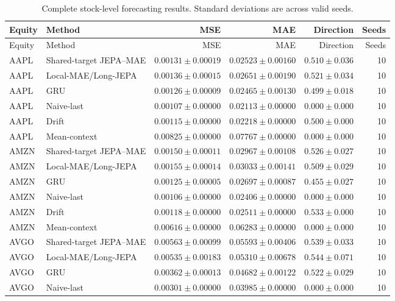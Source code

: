 \begin{longtable}{llrrrr}
\caption{Complete stock-level forecasting results. Standard deviations are across valid seeds.}\label{tab:appendix_stock_metrics}\\
\toprule
Equity & Method & MSE & MAE & Direction & Seeds \\
\midrule
\endfirsthead
\toprule
Equity & Method & MSE & MAE & Direction & Seeds \\
\midrule
\endhead
AAPL & Shared-target JEPA--MAE & $0.00131 \pm 0.00019$ & $0.02523 \pm 0.00160$ & $0.510 \pm 0.036$ & 10 \\
AAPL & Local-MAE/Long-JEPA & $0.00136 \pm 0.00015$ & $0.02651 \pm 0.00190$ & $0.521 \pm 0.034$ & 10 \\
AAPL & GRU & $0.00126 \pm 0.00009$ & $0.02465 \pm 0.00130$ & $0.499 \pm 0.018$ & 10 \\
AAPL & Naive-last & $0.00107 \pm 0.00000$ & $0.02113 \pm 0.00000$ & $0.000 \pm 0.000$ & 10 \\
AAPL & Drift & $0.00115 \pm 0.00000$ & $0.02218 \pm 0.00000$ & $0.500 \pm 0.000$ & 10 \\
AAPL & Mean-context & $0.00825 \pm 0.00000$ & $0.07767 \pm 0.00000$ & $0.000 \pm 0.000$ & 10 \\
AMZN & Shared-target JEPA--MAE & $0.00150 \pm 0.00011$ & $0.02967 \pm 0.00108$ & $0.526 \pm 0.027$ & 10 \\
AMZN & Local-MAE/Long-JEPA & $0.00155 \pm 0.00014$ & $0.03033 \pm 0.00141$ & $0.509 \pm 0.029$ & 10 \\
AMZN & GRU & $0.00125 \pm 0.00005$ & $0.02697 \pm 0.00087$ & $0.455 \pm 0.027$ & 10 \\
AMZN & Naive-last & $0.00106 \pm 0.00000$ & $0.02406 \pm 0.00000$ & $0.000 \pm 0.000$ & 10 \\
AMZN & Drift & $0.00118 \pm 0.00000$ & $0.02511 \pm 0.00000$ & $0.533 \pm 0.000$ & 10 \\
AMZN & Mean-context & $0.00616 \pm 0.00000$ & $0.06283 \pm 0.00000$ & $0.000 \pm 0.000$ & 10 \\
AVGO & Shared-target JEPA--MAE & $0.00563 \pm 0.00099$ & $0.05593 \pm 0.00406$ & $0.539 \pm 0.033$ & 10 \\
AVGO & Local-MAE/Long-JEPA & $0.00535 \pm 0.00183$ & $0.05310 \pm 0.00678$ & $0.544 \pm 0.071$ & 10 \\
AVGO & GRU & $0.00362 \pm 0.00013$ & $0.04682 \pm 0.00122$ & $0.522 \pm 0.029$ & 10 \\
AVGO & Naive-last & $0.00301 \pm 0.00000$ & $0.03985 \pm 0.00000$ & $0.000 \pm 0.000$ & 10 \\

\end{longtable}
